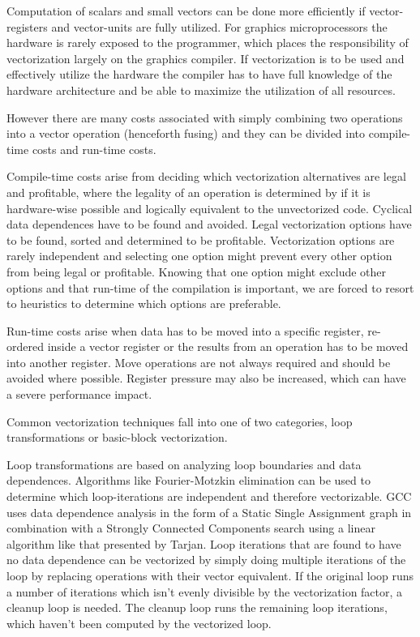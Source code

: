 \documentclass[12pt,a4paper,onecolumn,twoside,openright]{report}
\begin{document}
Computation of scalars and small vectors can be done more efficiently if vector-registers and vector-units are fully utilized. For graphics microprocessors the hardware is rarely exposed to the programmer, which places the responsibility of vectorization largely on the graphics compiler. If vectorization is to be used and effectively utilize the hardware the compiler has to have full knowledge of the hardware architecture and be able to maximize the utilization of all resources.

However there are many costs associated with simply combining two operations into a vector operation (henceforth fusing) and they can be divided into compile-time costs and run-time costs.

Compile-time costs arise from deciding which vectorization alternatives are legal and profitable, where the legality of an operation is determined by if it is hardware-wise possible and logically equivalent to the unvectorized code. Cyclical data dependences have to be found and avoided. Legal vectorization options have to be found, sorted and determined to be profitable. Vectorization options are rarely independent and selecting one option might prevent every other option from being legal or profitable. Knowing that one option might exclude other options and that run-time of the compilation is important, we are forced to resort to heuristics to determine which options are preferable.

Run-time costs arise when data has to be moved into a specific register, re-ordered inside a vector register or the results from an operation has to be moved into another register. Move operations are not always required and should be avoided where possible. Register pressure may also be increased, which can have a severe performance impact.


Common vectorization techniques fall into one of two categories, loop transformations or basic-block vectorization.

Loop transformations are based on analyzing loop boundaries and data dependences. Algorithms like Fourier-Motzkin elimination\cite{aho2007compilers} can be used to determine which loop-iterations are independent and therefore vectorizable. GCC uses data dependence analysis in the form of a Static Single Assignment \cite{cytron1991efficiently}\cite{naishlos2004autovectorization} graph in combination with a Strongly Connected Components search using a linear algorithm like that presented by Tarjan\cite{tarjan1972depth}. Loop iterations that are found to have no data dependence can be vectorized by simply doing multiple iterations of the loop by replacing operations with their vector equivalent. If the original loop runs a number of iterations which isn't evenly divisible by the vectorization factor, a cleanup loop is needed. The cleanup loop runs the remaining loop iterations, which haven't been computed by the vectorized loop.
\end{document}
